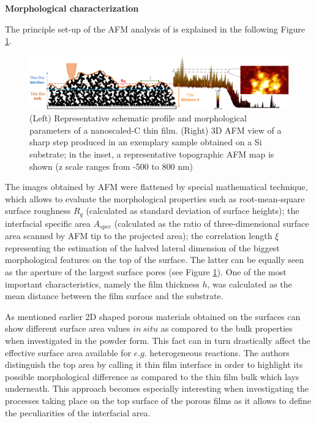 \medskip
\textbf{Morphological characterization}

The principle set-up of the AFM analysis of is explained in the following Figure \ref{fig:borghi_afm}.

\begin{figure}[H]
\centering
\includegraphics[width=1\textwidth]{Figures/Theory/AFM_Borghi.jpg}
\medskip
\caption{(Left) Representative schematic profile and morphological parameters of a nanoscaled-C thin film. (Right) 3D AFM view of a sharp step produced in an exemplary sample obtained on a Si substrate; in the inset, a representative topographic AFM map is shown (z scale ranges from -500 to 800 nm) \cite{borghi_quantitative_2019}}
\label{fig:borghi_afm}
\end{figure}

The images obtained by AFM were flattened by special mathematical technique, which allows to evaluate the morphological properties such as root-mean-square surface roughness $R_q$ (calculated as standard deviation of surface heights); the interfacial specific area $A_{spec}$ (calculated as the ratio of three-dimensional surface area scanned by AFM tip to the projected area); the correlation length $\xi$ representing the estimation of the halved lateral dimension of the biggest morphological features on the top of the surface. The latter can be equally seen as the aperture of the largest surface pores (see Figure \ref{fig:borghi_afm}). One of the most important characteristics, namely the film thickness $h$, was calculated as the mean distance between the film surface and the substrate. 

As mentioned earlier 2D shaped porous materials obtained on the surfaces can show different surface area values $in\:situ$ as compared to the bulk properties when investigated in the powder form. This fact can in turn drastically affect the effective surface area available for $e.g.$ heterogeneous reactions. The authors distinguish the top area by calling it thin film interface in order to highlight its possible morphological difference as compared to the thin film bulk which lays underneath. This approach becomes especially interesting when investigating the processes taking place on the top surface of the porous films as it allows to define the peculiarities of the interfacial area. 


